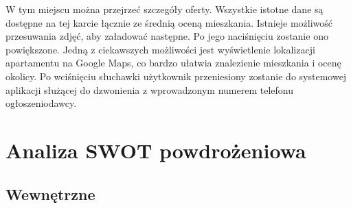 \documentclass[polish, 11pt]{article}
\begin{document}
        W tym miejscu można przejrzeć szczegóły oferty. Wszystkie istotne dane są dostępne na tej karcie łącznie ze średnią oceną mieszkania. Istnieje możliwość przesuwania zdjęć, aby załadować następne. Po jego naciśnięciu zostanie ono powiększone. Jedną z ciekawszych możliwości jest wyświetlenie lokalizacji apartamentu na Google Maps, co bardzo ułatwia znalezienie mieszkania i ocenę okolicy. Po wciśnięciu słuchawki użytkownik przeniesiony zostanie do systemowej aplikacji służącej do dzwonienia z wprowadzonym numerem telefonu ogłoszeniodawcy.
\section{Analiza SWOT powdrożeniowa}
    \subsection{Wewnętrzne}
\end{document}

